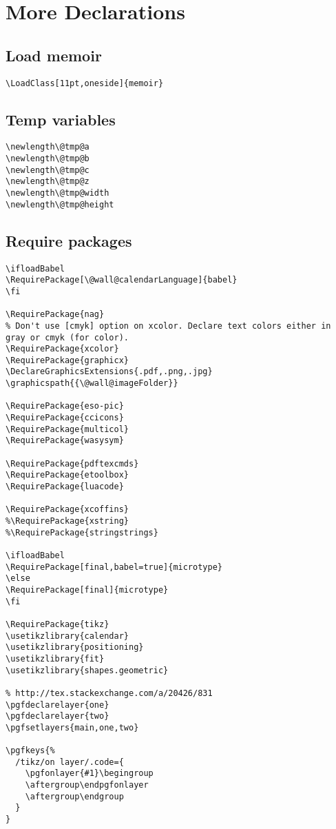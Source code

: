 \documentclass[11pt,oneside]{memoir-article}
\begin{document}
\chapter{More Declarations}
\label{sec:org6609f0a}
\section{Load memoir}
\label{sec:org59e85ba}

\begin{verbatim}
\LoadClass[11pt,oneside]{memoir}
\end{verbatim}

\section{Temp variables}
\label{sec:org726850b}

\begin{verbatim}
\newlength\@tmp@a
\newlength\@tmp@b
\newlength\@tmp@c
\newlength\@tmp@z
\newlength\@tmp@width
\newlength\@tmp@height
\end{verbatim}

\section{Require packages}
\label{sec:orgc669966}

\begin{verbatim}
\ifloadBabel
\RequirePackage[\@wall@calendarLanguage]{babel}
\fi

\RequirePackage{nag}
% Don't use [cmyk] option on xcolor. Declare text colors either in gray or cmyk (for color).
\RequirePackage{xcolor}
\RequirePackage{graphicx}
\DeclareGraphicsExtensions{.pdf,.png,.jpg}
\graphicspath{{\@wall@imageFolder}}

\RequirePackage{eso-pic}
\RequirePackage{ccicons}
\RequirePackage{multicol}
\RequirePackage{wasysym}

\RequirePackage{pdftexcmds}
\RequirePackage{etoolbox}
\RequirePackage{luacode}

\RequirePackage{xcoffins}
%\RequirePackage{xstring}
%\RequirePackage{stringstrings}

\ifloadBabel
\RequirePackage[final,babel=true]{microtype}
\else
\RequirePackage[final]{microtype}
\fi

\RequirePackage{tikz}
\usetikzlibrary{calendar}
\usetikzlibrary{positioning}
\usetikzlibrary{fit}
\usetikzlibrary{shapes.geometric}

% http://tex.stackexchange.com/a/20426/831
\pgfdeclarelayer{one}
\pgfdeclarelayer{two}
\pgfsetlayers{main,one,two}

\pgfkeys{%
  /tikz/on layer/.code={
    \pgfonlayer{#1}\begingroup
    \aftergroup\endpgfonlayer
    \aftergroup\endgroup
  }
}
\end{verbatim}
\end{document}
